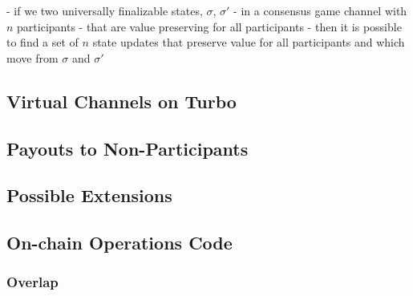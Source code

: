 \documentclass{article}
\begin{document}
- if we two universally finalizable states, $\sigma$, $\sigma'$
- in a consensus game channel with $n$ participants
- that are value preserving for all participants
- then it is possible to find a set of $n$ state updates that preserve value for all participants and which move from $\sigma$ and $\sigma'$


\subsection{Virtual Channels on Turbo}
\subsection{Payouts to Non-Participants}
\subsection{Possible Extensions}

\subsection{On-chain Operations Code}
\subsubsection{Overlap}
\begin{minipage}{\linewidth} %
  
\end{minipage}
\end{document}
